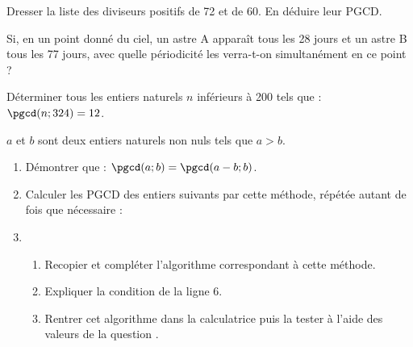 \documentclass{cornouaille}
\begin{document}
\begin{colonne*exercice}
\begin{exercice}
Dresser la liste des diviseurs positifs de 72 et de 60. En déduire leur PGCD.
\end{exercice}

\begin{exercice}
Si, en un point donné du ciel, un astre A apparaît tous les 28 jours et un astre B tous les 77 jours, avec quelle périodicité les verra-t-on simultanément en ce point ?
\end{exercice}

\begin{exercice}
Déterminer tous les entiers naturels $n$ inférieurs à 200 tels que : $\pgcd(n;324)=12$.
\end{exercice}

\begin{exercice}[\algo]
  $a$ et $b$ sont deux entiers naturels non nuls tels que
  $a>b$.\vspace{-10pt}

\begin{enumerate}
\item Démontrer que : $\pgcd(a;b)=\pgcd(a-b ; b)$.
\item \label{Exo12Question2}Calculer les PGCD des entiers suivants par cette méthode, répétée autant de fois que nécessaire :
\item\begin{enumerate} 
\item Recopier et compléter l’algorithme correspondant à cette méthode.

{\centering
\begin{algorithme}
\BlocVariables
{}
\BlocEntrees
{}
\BlocTraitements
{}
\BlocAffichage
\AfficherVar{$\dots$}
\end{algorithme}
\par}
\item Expliquer la condition de la ligne 6.
\item Rentrer cet algorithme dans la calculatrice puis
la tester à l’aide des valeurs de la question
.
\end{enumerate}
\end{enumerate}
\end{exercice}


\end{colonne*exercice}
\end{document}
